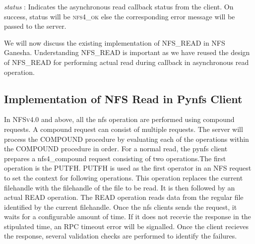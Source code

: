 \noindent\textit{status} : Indicates the asynchronous read callback status from the client. On success, status will be \textsc{nfs4\_ok} else the corresponding error message will be passed to the server.



We will now discuss the existing implementation of \textsc{NFS\_READ} in NFS Ganesha. Understanding \textsc{NFS\_READ} is important as we have reused the design of \textsc{NFS\_READ} for performing actual read during callback in asynchronous read operation.


\subsection{Implementation of NFS Read in Pynfs Client}
 
In \textsc{NFSv4.0} and above, all the nfs operation are performed using compound requests. A compound request can consist of multiple requests. The server will process the COMPOUND procedure by evaluating each of the operations within the COMPOUND procedure in order. For a normal read, the pynfs client prepares a nfs4\_compound request consisting of two operations.The first operation is the PUTFH. PUTFH is used as the first operator in an NFS request to set the context for following operations. This operation replaces the current filehandle with the filehandle of the file to be read. It is then followed by an actual READ operation. The READ operation reads data from the regular file identified by the current filehandle. Once the nfs clients sends the request, it waits for a configurable amount of time. If it does not recevie the response in the stipulated time, an RPC timeout error will be signalled. Once the client recieves the response, several validation checks are performed to identify the failures.

